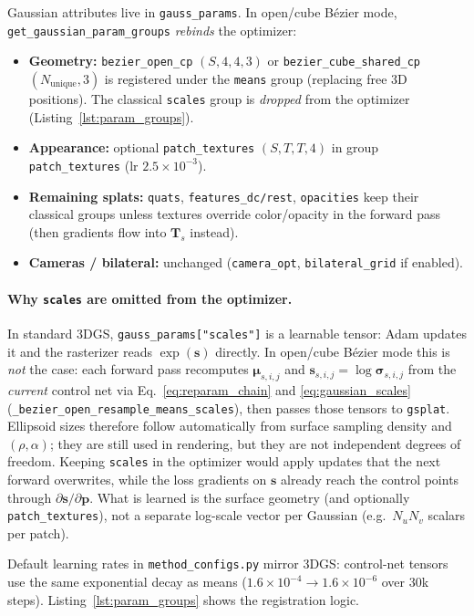 \documentclass{report}
\newcommand{\code}[1]{\nolinkurl{#1}}
\begin{document}
Gaussian attributes live in \code{gauss\_params}. In open/cube B\'ezier mode, \code{get\_gaussian\_param\_groups} \emph{rebinds} the optimizer:
\begin{itemize}
    \item \textbf{Geometry:} \code{bezier\_open\_cp} $(S,4,4,3)$ or \code{bezier\_cube\_shared\_cp} $(N_{\mathrm{unique}},3)$ is registered under the \code{means} group (replacing free 3D positions). The classical \code{scales} group is \emph{dropped} from the optimizer (Listing~\ref{lst:param_groups}).
    \item \textbf{Appearance:} optional \code{patch\_textures} $(S,T,T,4)$ in group \code{patch\_textures} (lr $2.5\times 10^{-3}$).
    \item \textbf{Remaining splats:} \code{quats}, \code{features\_dc/rest}, \code{opacities} keep their classical groups unless textures override color/opacity in the forward pass (then gradients flow into $\mathbf{T}_s$ instead).
    \item \textbf{Cameras / bilateral:} unchanged (\code{camera\_opt}, \code{bilateral\_grid} if enabled).
\end{itemize}

\paragraph{Why \texttt{scales} are omitted from the optimizer.}
In standard 3DGS, \code{gauss\_params["scales"]} is a learnable tensor: Adam updates it and the rasterizer reads $\exp(\mathbf{s})$ directly. In open/cube B\'ezier mode this is \emph{not} the case: each forward pass recomputes $\boldsymbol{\mu}_{s,i,j}$ and $\mathbf{s}_{s,i,j}=\log\boldsymbol{\sigma}_{s,i,j}$ from the \emph{current} control net via Eq.~\eqref{eq:reparam_chain} and \eqref{eq:gaussian_scales} (\texttt{\_bezier\_open\_resample\_means\_scales}), then passes those tensors to \texttt{gsplat}. Ellipsoid sizes therefore follow automatically from surface sampling density and $(\rho,\alpha)$; they are still used in rendering, but they are not independent degrees of freedom. Keeping \code{scales} in the optimizer would apply updates that the next forward overwrites, while the loss gradients on $\mathbf{s}$ already reach the control points through $\partial\mathbf{s}/\partial\mathbf{p}$. What is learned is the surface geometry (and optionally \texttt{patch\_textures}), not a separate log-scale vector per Gaussian (e.g.\ $N_u N_v$ scalars per patch).

Default learning rates in \texttt{method\_configs.py} mirror 3DGS: control-net tensors use the same exponential decay as means ($1.6\times 10^{-4}\rightarrow 1.6\times 10^{-6}$ over 30k steps). Listing~\ref{lst:param_groups} shows the registration logic.
\end{document}
